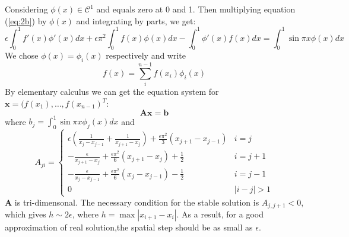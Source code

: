 \documentclass{article}
\begin{document}
Considering $\phi(x) \in \mathcal{C}^1$ and equals zero at 0 and 1. Then multiplying equation (\ref{eq:2b}) by $\phi(x)$ and integrating by parts, we get:
\begin{equation}
\epsilon\int_0^1 f'(x)\phi'(x)dx+\epsilon\pi^2\int_0^1 f(x)\phi(x)dx-\int_0^1\phi'(x)f(x)dx=\int_0^1\sin\pi x \phi(x)dx
\end{equation}
We chose $\phi(x)=\phi_i(x)$ respectively and write 
\begin{equation}
f(x)=\sum_i^{n-1}f(x_i)\phi_i(x)
\end{equation}
By elementary calculus we can get the equation system for $\bm{x}=(f(x_1),\dots,f(x_{n-1})^T$:
\begin{equation}
\bm{A}\bm{x}=\bm{b}
\end{equation}
where
$b_j=\int_0^1 \sin\pi x \phi_j(x)dx$
and
\begin{equation}
A_{ji}=\begin{cases}
\epsilon(\frac{1}{x_j-x_{j-1}}+\frac{1}{x_{j+1}-x_j})+\frac{\epsilon\pi^2}{3}(x_{j+1}-x_{j-1})&i=j
\\
-\frac{\epsilon}{x_{j+1}-x_j}+\frac{\epsilon\pi^2}{6}(x_{j+1}-x_j)+\frac{1}{2}&i=j+1
\\
-\frac{\epsilon}{x_j-x_{j-1}}+\frac{\epsilon\pi^2}{6}(x_{j}-x_{j-1})-\frac{1}{2}&i=j-1
\\
0&|i-j|>1
\end{cases}
\end{equation}
$\bm{A}$ is tri-dimensonal. The necessary condition for the stable solution is $A_{j,j+1}<0$, which gives $h \sim 2\epsilon$, where $h=\max |x_{i+1}-x_i|$. As a result, for a good approximation of real solution,the spatial step should be as small as $\epsilon$. 
\end{document}
